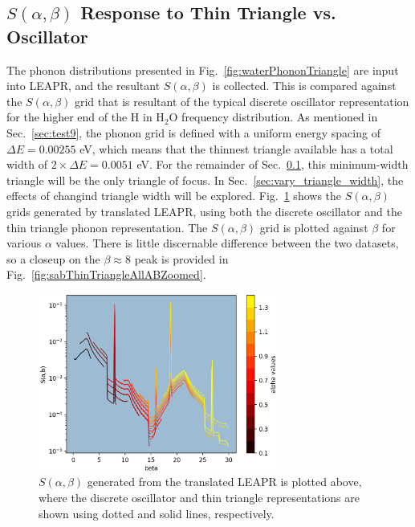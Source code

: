 \documentclass[Master.tex]{subfiles}
\begin{document}
  \subsection{$S(\alpha,\beta)$ Response to Thin Triangle vs. Oscillator}\label{sec:thin_triangle_vs_delta}
    The phonon distributions presented in Fig.~\ref{fig:waterPhononTriangle} are input into LEAPR, and the resultant $S(\alpha,\beta)$ is collected. This is compared against the $S(\alpha,\beta)$ grid that is resultant of the typical discrete oscillator representation for the higher end of the H in H$_2$O frequency distribution. As mentioned in Sec.~\ref{sec:test9}, the phonon grid is defined with a uniform energy spacing of $\Delta E=0.00255$  eV, which means that the thinnest triangle available has a total width of $2\times\Delta E=0.0051$ eV. For the remainder of Sec.~\ref{sec:thin_triangle_vs_delta}, this minimum-width triangle will be the only triangle of focus. In Sec.~\ref{sec:vary_triangle_width}, the effects of changind triangle width will be explored.
    Fig.~\ref{fig:sabThinTriangleAllAB} shows the $S(\alpha,\beta)$ grids generated by translated LEAPR, using both the discrete oscillator and the thin triangle phonon representation. The $S(\alpha,\beta)$ grid is plotted against $\beta$ for various $\alpha$ values. There is little discernable difference between the two datasets, so a closeup on the $\beta\approx8$ peak is provided in Fig.~\ref{fig:sabThinTriangleAllABZoomed}.

    \begin{figure}[h]
      \begin{center}
        \includegraphics[width=0.7\textwidth]{sab_thinTriangle_and_delta_all_ABb}
        \caption[$S(\alpha,\beta)$ grid, comparing oscillator vs. thin triangle representation (translated LEAPR used)]{$S(\alpha,\beta)$ generated from the translated LEAPR is plotted above, where the discrete oscillator and thin triangle representations are shown using dotted and solid lines, respectively.}
        \label{fig:sabThinTriangleAllAB}
      \end{center}
    \end{figure}
\end{document}
